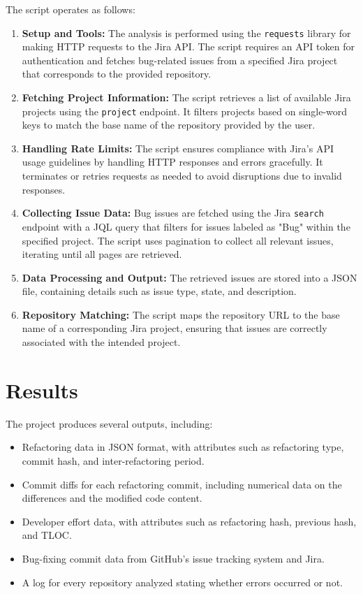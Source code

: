 \documentclass[sigconf]{acmart}
\begin{document}
The script operates as follows:

\begin{enumerate}
    \item \textbf{Setup and Tools:} The analysis is performed using the \texttt{requests} library for making HTTP requests to the Jira API. The script requires an API token for authentication and fetches bug-related issues from a specified Jira project that corresponds to the provided repository.

    \item \textbf{Fetching Project Information:} The script retrieves a list of available Jira projects using the \texttt{project} endpoint. It filters projects based on single-word keys to match the base name of the repository provided by the user.

    \item \textbf{Handling Rate Limits:} The script ensures compliance with Jira's API usage guidelines by handling HTTP responses and errors gracefully. It terminates or retries requests as needed to avoid disruptions due to invalid responses.

    \item \textbf{Collecting Issue Data:} Bug issues are fetched using the Jira \texttt{search} endpoint with a JQL query that filters for issues labeled as "Bug" within the specified project. The script uses pagination to collect all relevant issues, iterating until all pages are retrieved.

    \item \textbf{Data Processing and Output:} The retrieved issues are stored into a JSON file, containing details such as issue type, state, and description.

    \item \textbf{Repository Matching:} The script maps the repository URL to the base name of a corresponding Jira project, ensuring that issues are correctly associated with the intended project.
\end{enumerate}


\section{Results}
The project produces several outputs, including:

\begin{itemize}
  \item Refactoring data in JSON format, with attributes such as refactoring type, commit hash, and inter-refactoring period.
  \item Commit diffs for each refactoring commit, including numerical data on the differences and the modified code content.
  \item Developer effort data, with attributes such as refactoring hash, previous hash, and TLOC.
  \item Bug-fixing commit data from GitHub's issue tracking system and Jira.
  \item A log for every repository analyzed stating whether errors occurred or not.
\end{itemize}
\end{document}
